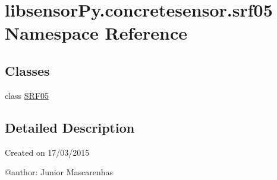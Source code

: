 \hypertarget{namespacelibsensorPy_1_1concretesensor_1_1srf05}{}\section{libsensor\+Py.\+concretesensor.\+srf05 Namespace Reference}
\label{namespacelibsensorPy_1_1concretesensor_1_1srf05}
\subsection*{Classes}
\begin{DoxyCompactItemize}
\item 
class \hyperlink{classlibsensorPy_1_1concretesensor_1_1srf05_1_1SRF05}{S\+R\+F05}
\end{DoxyCompactItemize}


\subsection{Detailed Description}
\begin{DoxyVerb}Created on 17/03/2015

@author: Junior Mascarenhas
\end{DoxyVerb}
 